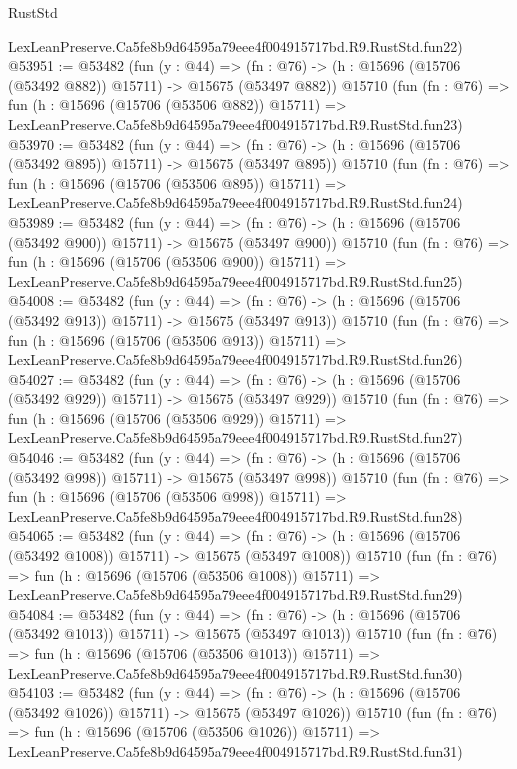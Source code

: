 \begin{lexlean}{RustStd}
\begin{coremodule}
    LexLeanPreserve.Ca5fe8b9d64595a79eee4f004915717bd.R9.RustStd.fun22)
@53951 := @53482
    (fun (y : @44) =>
    (fn : @76) -> (h : @15696 (@15706 (@53492 @882)) @15711) -> @15675 (@53497 @882))
    @15710
    (fun (fn : @76) =>
    fun (h : @15696 (@15706 (@53506 @882)) @15711) =>
    LexLeanPreserve.Ca5fe8b9d64595a79eee4f004915717bd.R9.RustStd.fun23)
@53970 := @53482
    (fun (y : @44) =>
    (fn : @76) -> (h : @15696 (@15706 (@53492 @895)) @15711) -> @15675 (@53497 @895))
    @15710
    (fun (fn : @76) =>
    fun (h : @15696 (@15706 (@53506 @895)) @15711) =>
    LexLeanPreserve.Ca5fe8b9d64595a79eee4f004915717bd.R9.RustStd.fun24)
@53989 := @53482
    (fun (y : @44) =>
    (fn : @76) -> (h : @15696 (@15706 (@53492 @900)) @15711) -> @15675 (@53497 @900))
    @15710
    (fun (fn : @76) =>
    fun (h : @15696 (@15706 (@53506 @900)) @15711) =>
    LexLeanPreserve.Ca5fe8b9d64595a79eee4f004915717bd.R9.RustStd.fun25)
@54008 := @53482
    (fun (y : @44) =>
    (fn : @76) -> (h : @15696 (@15706 (@53492 @913)) @15711) -> @15675 (@53497 @913))
    @15710
    (fun (fn : @76) =>
    fun (h : @15696 (@15706 (@53506 @913)) @15711) =>
    LexLeanPreserve.Ca5fe8b9d64595a79eee4f004915717bd.R9.RustStd.fun26)
@54027 := @53482
    (fun (y : @44) =>
    (fn : @76) -> (h : @15696 (@15706 (@53492 @929)) @15711) -> @15675 (@53497 @929))
    @15710
    (fun (fn : @76) =>
    fun (h : @15696 (@15706 (@53506 @929)) @15711) =>
    LexLeanPreserve.Ca5fe8b9d64595a79eee4f004915717bd.R9.RustStd.fun27)
@54046 := @53482
    (fun (y : @44) =>
    (fn : @76) -> (h : @15696 (@15706 (@53492 @998)) @15711) -> @15675 (@53497 @998))
    @15710
    (fun (fn : @76) =>
    fun (h : @15696 (@15706 (@53506 @998)) @15711) =>
    LexLeanPreserve.Ca5fe8b9d64595a79eee4f004915717bd.R9.RustStd.fun28)
@54065 := @53482
    (fun (y : @44) =>
    (fn : @76) -> (h : @15696 (@15706 (@53492 @1008)) @15711) -> @15675 (@53497 @1008))
    @15710
    (fun (fn : @76) =>
    fun (h : @15696 (@15706 (@53506 @1008)) @15711) =>
    LexLeanPreserve.Ca5fe8b9d64595a79eee4f004915717bd.R9.RustStd.fun29)
@54084 := @53482
    (fun (y : @44) =>
    (fn : @76) -> (h : @15696 (@15706 (@53492 @1013)) @15711) -> @15675 (@53497 @1013))
    @15710
    (fun (fn : @76) =>
    fun (h : @15696 (@15706 (@53506 @1013)) @15711) =>
    LexLeanPreserve.Ca5fe8b9d64595a79eee4f004915717bd.R9.RustStd.fun30)
@54103 := @53482
    (fun (y : @44) =>
    (fn : @76) -> (h : @15696 (@15706 (@53492 @1026)) @15711) -> @15675 (@53497 @1026))
    @15710
    (fun (fn : @76) =>
    fun (h : @15696 (@15706 (@53506 @1026)) @15711) =>
    LexLeanPreserve.Ca5fe8b9d64595a79eee4f004915717bd.R9.RustStd.fun31)

\end{coremodule}
\end{lexlean}
